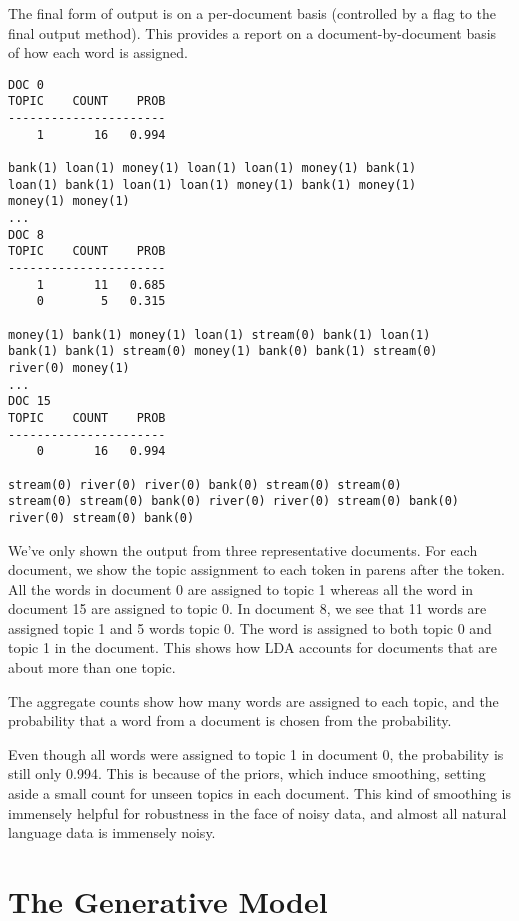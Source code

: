 The final form of output is on a per-document basis (controlled
by a flag to the final output method).  This provides a report
on a document-by-document basis of how each word is assigned.
%
\begin{verbatim}
DOC 0
TOPIC    COUNT    PROB
----------------------
    1       16   0.994

bank(1) loan(1) money(1) loan(1) loan(1) money(1) bank(1) 
loan(1) bank(1) loan(1) loan(1) money(1) bank(1) money(1) 
money(1) money(1)
...
DOC 8
TOPIC    COUNT    PROB
----------------------
    1       11   0.685
    0        5   0.315

money(1) bank(1) money(1) loan(1) stream(0) bank(1) loan(1) 
bank(1) bank(1) stream(0) money(1) bank(0) bank(1) stream(0) 
river(0) money(1)
...
DOC 15
TOPIC    COUNT    PROB
----------------------
    0       16   0.994

stream(0) river(0) river(0) bank(0) stream(0) stream(0) 
stream(0) stream(0) bank(0) river(0) river(0) stream(0) bank(0) 
river(0) stream(0) bank(0)
\end{verbatim}
%
We've only shown the output from three representative documents.  For
each document, we show the topic assignment to each token in parens
after the token.  All the words in document 0 are assigned to topic 1
whereas all the word in document 15 are assigned to topic 0.  In
document 8, we see that 11 words are assigned topic 1 and 5 words
topic 0.  The word  is assigned to both topic 0
and topic 1 in the document.  This shows how LDA accounts for
documents that are about more than one topic.

The aggregate counts show how many words are assigned to each topic,
and the probability that a word from a document is chosen from the
probability.  

Even though all words were assigned to topic 1 in document 0, the
probability is still only 0.994.  This is because of the priors, which
induce smoothing, setting aside a small count for unseen topics in
each document.  This kind of smoothing is immensely helpful for
robustness in the face of noisy data, and almost all natural language
data is immensely noisy.








\section{The Generative Model}

